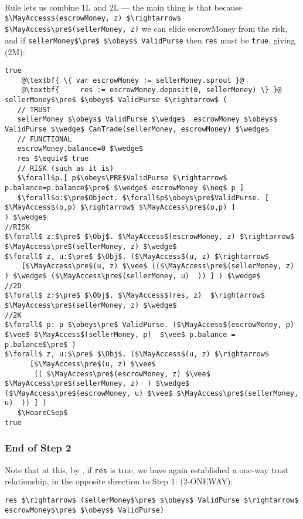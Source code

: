 Rule  lets us combine 1L and 2L --- the main thing is that because
%
\lstinline+$\MayAccess$(escrowMoney, z) $\rightarrow$ $\MayAccess\pre$(sellerMoney, z)+
%
we can elide escrowMoney from the risk, and if
%
\lstinline+sellerMoney$\pre$ $\obeys$ ValidPurse+
%
then \lstinline+res+ must be \lstinline+true+.
%
giving (2M):

\begin{lstlisting}[escapechar=@]
true
    @\textbf{ \{ var escrowMoney := sellerMoney.sprout }@
    @\textbf{     res := escrowMoney.deposit(0, sellerMoney) \} }@
sellerMoney$\pre$ $\obeys$ ValidPurse $\rightarrow$ (
   // TRUST
   sellerMoney $\obeys$ ValidPurse $\wedge$  escrowMoney $\obeys$ ValidPurse $\wedge$ CanTrade(sellerMoney, escrowMoney) $\wedge$
   // FUNCTIONAL
   escrowMoney.balance=0 $\wedge$
   res $\equiv$ true
   // RISK (such as it is)
   $\forall$p.[ p$\obeys\PRE$ValidPurse $\rightarrow$ p.balance=p.balance$\pre$ $\wedge$ escrowMoney $\neq$ p ] 
   $\forall$o:$\pre$Object. $\forall$p$\obeys\pre$ValidPurse. [ $\MayAccess$(o,p) $\rightarrow$ $\MayAccess\pre$(o,p) ]
) $\wedge$
//RISK
$\forall$ z:$\pre$ $\Obj$. $\MayAccess$(escrowMoney, z) $\rightarrow$ $\MayAccess\pre$(sellerMoney, z) $\wedge$
$\forall$ z, u:$\pre$ $\Obj$. ($\MayAccess$(u, z) $\rightarrow$
    [$\MayAccess\pre$(u, z) $\vee$ (($\MayAccess\pre$(sellerMoney, z)  ) $\wedge$ ($\MayAccess\pre$(sellerMoney, u)  )) ] ) $\wedge$
//2D
$\forall$ z:$\pre$ $\Obj$. $\MayAccess$(res, z)  $\rightarrow$ $\MayAccess\pre$(sellerMoney, z) $\wedge$
//2K
$\forall$ p: p $\obeys\pre$ ValidPurse. ($\MayAccess$(escrowMoney, p) $\vee$ $\MayAccess$(sellerMoney, p)  $\vee$ p.balance = p.balance$\pre$ )
$\forall$ z, u:$\pre$ $\Obj$. ($\MayAccess$(u, z) $\rightarrow$
      [$\MayAccess\pre$(u, z) $\vee$
       (( $\MayAccess\pre$(escrowMoney, z) $\vee$ $\MayAccess\pre$(sellerMoney, z)  ) $\wedge$ ($\MayAccess\pre$(escrowMoney, u) $\vee$ $\MayAccess\pre$(sellerMoney, u)  )) ] )
   $\HoareCSep$
true
\end{lstlisting}


\subsubsection{End of Step 2}

Note that at this, by , if \lstinline+res+ is true, we
have again established a one-way trust relationship, in the opposite
direction to Step 1: (2-ONEWAY):

\begin{lstlisting}[backgroundcolor=\color{yellow}]
res $\rightarrow$ (sellerMoney$\pre$ $\obeys$ ValidPurse $\rightarrow$  escrowMoney$\pre$ $\obeys$ ValidPurse)
\end{lstlisting}

